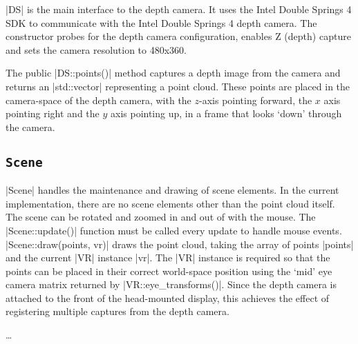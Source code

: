 \documentclass[pageno]{jpaper}
\begin{document}
|DS| is the main interface to the depth camera. It uses the Intel Double Springs
4 SDK to communicate with the Intel Double Springs 4 depth camera. The
constructor probes for the depth camera configuration, enables Z (depth) capture
and sets the camera resolution to 480x360.

The public |DS::points()| method captures a depth image from the camera and
returns an |std::vector| representing a point cloud. These points are placed in
the camera-space of the depth camera, with the $z$-axis pointing forward, the
$x$ axis pointing right and the $y$ axis pointing up, in a frame that looks
`down' through the camera.

\subsection{\lstinline|Scene|}

|Scene| handles the maintenance and drawing of scene elements. In the current
implementation, there are no scene elements other than the point cloud
itself. The scene can be rotated and zoomed in and out of with the mouse. The
|Scene::update()| function must be called every update to handle mouse
events. |Scene::draw(points, vr)| draws the point cloud, taking the array of
points |points| and the current |VR| instance |vr|. The |VR| instance is
required so that the points can be placed in their correct world-space position
using the `mid' eye camera matrix returned by |VR::eye_transforms()|. Since the
depth camera is attached to the front of the head-mounted display, this achieves
the effect of registering multiple captures from the depth camera.

\ldots



\end{document}
